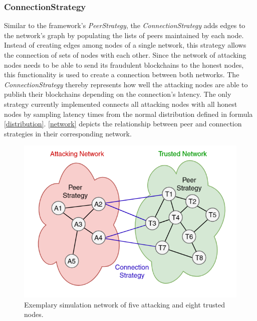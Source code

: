 \documentclass[a4paper,12pt,twoside]{report}
\begin{document}
\subsubsection{ConnectionStrategy} \label{connstrat}
Similar to the framework's \textit{PeerStrategy}, the \textit{ConnectionStrategy} adds edges to the network's graph by populating the lists of peers maintained by each node. Instead of creating edges among nodes of a single network, this strategy allows the connection of sets of nodes with each other. Since the network of attacking nodes needs to be able to send its fraudulent blockchains to the honest nodes, this functionality is used to create a connection between both networks. The \textit{ConnectionStrategy} thereby represents how well the attacking nodes are able to publish their blockchains depending on the connection's latency. The only strategy currently implemented connects all attacking nodes with all honest nodes by sampling latency times from the normal distribution defined in formula \ref{distribution}. \autoref{network} depicts the relationship between peer and connection strategies in their corresponding network.
\begin{figure}[ht]
	\centering
  \includegraphics[width=\textwidth]{Network.png}
	\caption{Exemplary simulation network of five attacking and eight trusted nodes.}
	\label{network}
\end{figure}
\end{document}
